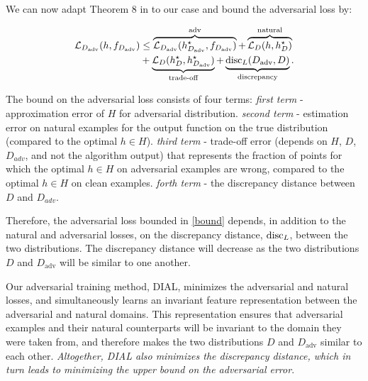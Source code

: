 We can now adapt Theorem 8 in \citep{mansour2009domain} to our case and bound the adversarial loss by:

\begin{equation}
\begin{aligned}
\label{bound}
\mathcal{L}_{D_{\text{adv}}}(h,f_{D_{\text{adv}}})
&\leq
\overbrace{ \mathcal{L}_{D_{\text{adv}}}(h_{D_{\text{adv}}}^{\star}, f_{D_{\text{adv}}})}^{\text{adv}}
+
\overbrace{\mathcal{\mathcal{L}}_{D}(h,h_{D}^{\star})}^{\text{natural}}
\\
&+
\underbrace{\mathcal{L}_{D}(h^{\star}_{D},h^{\star}_{D_\text{adv}})}_{\text{trade-off}}
+\underbrace{\operatorname{disc}_{L}(D_{\text{adv}}, D)}_{\text{discrepancy}}.
\end{aligned}
\end{equation}

The bound on the adversarial loss consists of four terms: \textit{first term} - approximation error of $H$ for adversarial distribution. \textit{second term} - estimation error on natural examples for the output function on the true distribution (compared to the optimal $h \in H$). \textit{third term} - trade-off error (depends on $H$, $D$, $D_{adv}$, and not the algorithm output) that represents the fraction of points for which the optimal $h \in H$ on adversarial examples are wrong, compared to the optimal $h \in H$ on clean examples. \textit{forth term} - the discrepancy distance between $D$ and $D_{adv}$.

Therefore, the adversarial loss bounded in \eqref{bound} depends, in addition to the natural and adversarial losses, on the discrepancy distance, $\operatorname{disc}_{L}$, between the two distributions. The discrepancy distance will decrease as the two distributions $D$ and $D_{\text{adv}}$ will be similar to one another.

Our adversarial training method, DIAL, minimizes the adversarial and natural losses, and simultaneously learns an invariant feature representation between the adversarial and natural domains. This representation ensures that adversarial examples and their natural counterparts will be invariant to the domain they were taken from, and therefore makes the two distributions $D$ and $D_{\text{adv}}$ similar to each other.
\textit{Altogether, DIAL also minimizes the discrepancy distance, which in turn leads to minimizing the upper bound on the adversarial error}.



